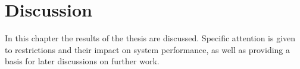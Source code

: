 \chapter{Discussion}
\label{cha:discussion}
    In this chapter the results of the thesis are discussed.
    Specific attention is given to restrictions and their impact on
    system performance, as well as providing a basis for later discussions
    on further work.

